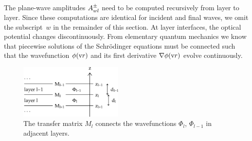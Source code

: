 The plane-wave amplitudes $A^\pm_{wl}$ need to be computed recursively
from layer to layer.
Since these computations are identical for incident and final waves,
we omit the subscript~$w$ in the remainder of this section.
At layer interfaces, the optical potential changes discontinuously.
From elementary quantum mechanics we know that
piecewise solutions of the Schrödinger equations must be connected
such that the wavefunction $\phi(\text{v}{r})$ and its first derivative
$\mathbf{\nabla}\phi(\text{v}{r})$ evolve continuously.

\begin{figure}[tb]
\begin{center}
\includegraphics[width=0.46\textwidth]{fig/drawing/multilayer_boundary.ps}
\end{center}
\caption{The transfer matrix $M_l$ connects the wavefunctions 
%
%
%
$\Phi_l$, $\Phi_{l-1}$ in adjacent layers.}
\label{Fboundary}
\end{figure}

